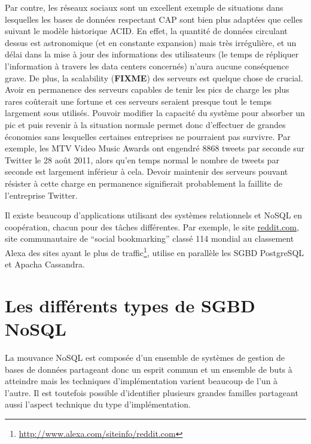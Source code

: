 \documentclass[11pt]{article}
\begin{document}
Par contre, les réseaux sociaux sont un excellent exemple de situations dans lesquelles les bases de données respectant CAP sont bien plus adaptées que celles suivant le modèle historique ACID. En effet, la quantité de données circulant dessus est astronomique (et en constante expansion) mais très irrégulière, et un délai dans la mise à jour des informations des utilisateurs (le temps de répliquer l'information à travers les data centers concernés) n'aura aucune conséquence grave. De plus, la scalability (\colorbox{BrickRed}{\textbf{FIXME}}) des serveurs est quelque chose de crucial. Avoir en permanence des serveurs capables de tenir les pics de charge les plus rares coûterait une fortune et ces serveurs seraient presque tout le temps largement sous utilisés. Pouvoir modifier la capacité du système pour absorber un pic et puis revenir à la situation normale permet donc d'effectuer de grandes économies sans lesquelles certaines entreprises ne pourraient pas survivre. Par exemple, les MTV Video Music Awards ont engendré 8868 tweets par seconde sur Twitter le 28 août 2011\cite{tweetspersecond}, alors qu'en temps normal le nombre de tweets par seconde est largement inférieur à cela. Devoir maintenir des serveurs pouvant résister à cette charge en permanence signifierait probablement la faillite de l'entreprise Twitter.

Il existe beaucoup d'applications utilisant des systèmes relationnels et NoSQL en coopération, chacun pour des tâches différentes. Par exemple, le site \url{reddit.com}, site communautaire de ``social bookmarking'' classé 114 mondial au classement Alexa des sites ayant le plus de traffic\footnote{\url{http://www.alexa.com/siteinfo/reddit.com}}, utilise en parallèle les SGBD PostgreSQL et Apacha Cassandra.

\section{Les différents types de SGBD NoSQL}
La mouvance NoSQL est composée d'un ensemble de systèmes de gestion de bases de données partageant donc un esprit commun et un ensemble de buts à atteindre mais les techniques d'implémentation varient beaucoup de l'un à l'autre. Il est toutefois possible d'identifier plusieurs grandes familles partageant aussi l'aspect technique du type d'implémentation. 
\end{document}
